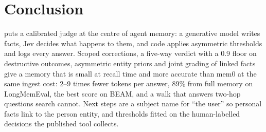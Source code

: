 \section{Conclusion}
\mx{} puts a calibrated judge at the centre of agent memory: a generative model writes facts, Jev decides what happens
to them, and code applies asymmetric thresholds and logs every answer. Scoped corrections, a five-way verdict with a
0.9 floor on destructive outcomes, asymmetric entity priors and joint grading of linked facts give a memory that is
small at recall time and more accurate than mem0 at the same ingest cost: 2--9 times fewer tokens per answer, 89\%
from full memory on LongMemEval, the best score on BEAM, and a walk that answers two-hop questions search cannot. Next
steps are a subject name for ``the user'' so personal facts link to the person entity, and thresholds fitted on the
human-labelled decisions the published tool collects.
